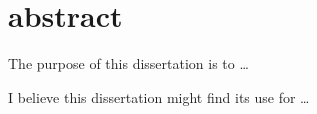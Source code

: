
\chapter*{abstract}

The purpose of this dissertation is to \dots

I believe this dissertation might find its use for \dots

\clearpage
